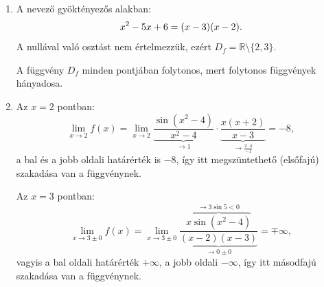 \documentclass[11pt]{scrartcl}
\begin{document}
\begin{enumerate}
	\item A nevező gyöktényezős alakban:
	      \[
		      x^2 - 5x + 6 = (x - 3)(x - 2)
		      \text.
	      \]
	      A nullával való osztást nem értelmezzük, ezért $D_f = \mathbb{R}
		      \setminus \{2, 3\}$.

	      A függvény $D_f$ minden pontjában folytonos, mert folytonos függvények
	      hányadosa.

	\item Az $x = 2$ pontban:
	      \[
		      \lim_{x \to 2} f(x)
		      = \lim_{x \to 2}
		      \underbrace{\frac{\sin\left(x^2 - 4\right)}{x^2 - 4}}_{\to 1} \cdot
		      \underbrace{\frac{x (x + 2)}{x - 3}}_{\to \frac{2 \cdot 4}{-1}}
		      = -8,
	      \]
	      a bal és a jobb oldali határérték is $-8$, így itt megszüntethető
	      (elsőfajú) szakadása van a függvénynek.

	      Az $x = 3$ pontban:
	      \[
		      \lim_{x \to 3 \pm 0} f(x)
		      = \lim_{x \to 3 \pm 0}
		      \frac{
			      \overbrace{x \sin\left(x^2 - 4\right)}^{\to 3 \sin 5 < 0}
		      }{
			      \underbrace{(x - 2)(x - 3)}_{\to 0 \pm 0}
		      }
		      = \mp \infty,
	      \]
	      vagyis a bal oldali határérték $+\infty$, a jobb oldali $-\infty$, így
	      itt másodfajú szakadása van a függvénynek.
\end{enumerate}
\end{document}
